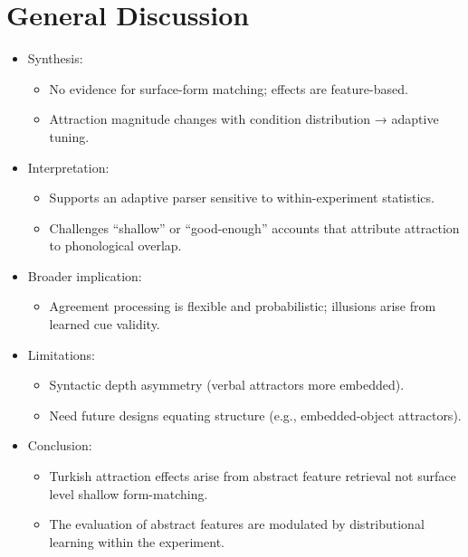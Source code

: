 \documentclass[
  authoryear,
  preprint]{elsarticle}
\providecommand{\tightlist}{%
  \setlength{\itemsep}{0pt}\setlength{\parskip}{0pt}}
\begin{document}
\section{General Discussion}\label{general-discussion}

\begin{itemize}
\tightlist
\item
  Synthesis:

  \begin{itemize}
  \tightlist
  \item
    No evidence for surface-form matching; effects are feature-based.
  \item
    Attraction magnitude changes with condition distribution → adaptive
    tuning.
  \end{itemize}
\item
  Interpretation:

  \begin{itemize}
  \tightlist
  \item
    Supports an adaptive parser sensitive to within-experiment
    statistics.
  \item
    Challenges ``shallow'' or ``good-enough'' accounts that attribute
    attraction to phonological overlap.
  \end{itemize}
\item
  Broader implication:

  \begin{itemize}
  \tightlist
  \item
    Agreement processing is flexible and probabilistic; illusions arise
    from learned cue validity.
  \end{itemize}
\item
  Limitations:

  \begin{itemize}
  \tightlist
  \item
    Syntactic depth asymmetry (verbal attractors more embedded).
  \item
    Need future designs equating structure (e.g., embedded-object
    attractors).
  \end{itemize}
\item
  Conclusion:

  \begin{itemize}
  \tightlist
  \item
    Turkish attraction effects arise from abstract feature retrieval not
    surface level shallow form-matching.\\
  \item
    The evaluation of abstract features are modulated by distributional
    learning within the experiment.
  \end{itemize}
\end{itemize}



\end{document}
